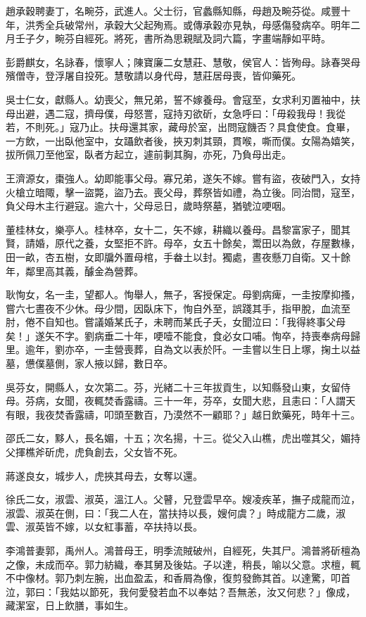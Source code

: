\begin{pinyinscope}
趙承穀聘妻丁，名畹芬，武進人。父士衍，官蠡縣知縣，母趙及畹芬從。咸豐十年，洪秀全兵破常州，承穀大父起殉焉。或傳承穀亦見執，母感傷發病卒。明年二月壬子夕，畹芬自經死。將死，書所為思親賦及詞六篇，字畫端靜如平時。

彭爵麒女，名詠春，懷寧人；陳寶廉二女慧莊、慧敬，侯官人：皆殉母。詠春哭母殯僧寺，登浮屠自投死。慧敬請以身代母，慧莊居母喪，皆仰藥死。

吳士仁女，獻縣人。幼喪父，無兄弟，誓不嫁養母。會寇至，女求利刃置袖中，扶母出避，遇二寇，擠母僕，母怒詈，寇持刃欲斫，女急呼曰：「毋殺我母！我從若，不則死。」寇乃止。扶母還其家，藏母於室，出問寇饑否？具食使食。食畢，一方飲，一出臥他室中，女躡飲者後，挾刃刺其頸，貫喉，嘶而僕。女陽為嬉笑，拔所佩刀至他室，臥者方起立，遽前剚其胸，亦死，乃負母出走。

王濟源女，棗強人。幼即能事父母。寡兄弟，遂矢不嫁。嘗有盜，夜破門入，女持火槍立暗陬，擊一盜斃，盜乃去。喪父母，葬祭皆如禮，為立後。同治間，寇至，負父母木主行避寇。逾六十，父母忌日，歲時祭墓，猶號泣哽咽。

董桂林女，樂亭人。桂林卒，女十二，矢不嫁，耕織以養母。昌黎富家子，聞其賢，請婚，原代之養，女堅拒不許。母卒，女五十餘矣，鬻田以為斂，存屋數椽，田一畝，杏五樹，女即牖外置母棺，手畚土以封。獨處，晝夜懸刀自衛。又十餘年，鄰里高其義，醵金為營葬。

耿恂女，名一圭，望都人。恂舉人，無子，客授保定。母劉病痺，一圭按摩抑搔，嘗六七晝夜不少休。母少間，因臥床下，恂自外至，誤踐其手，指甲脫，血流至肘，倦不自知也。嘗議婚某氏子，未聘而某氏子夭，女聞泣曰：「我得終事父母矣！」遂矢不字。劉病垂二十年，哽噎不能食，食必女口哺。恂卒，持喪奉病母歸里。逾年，劉亦卒，一圭營喪葬，自為文以表於阡。一圭嘗以生日上塚，掬土以益墓，憊僕墓側，家人掖以歸，數日卒。

吳芬女，開縣人，女次第二。芬，光緒二十三年拔貢生，以知縣發山東，女留侍母。芬病，女聞，夜輒焚香露禱。三十一年，芬卒，女聞大悲，且恚曰：「人謂天有眼，我夜焚香露禱，叩頭至數百，乃漠然不一顧耶？」越日飲藥死，時年十三。

邵氏二女，黟人，長名媚，十五；次名揚，十三。從父入山樵，虎出噬其父，媚持父揮樵斧斫虎，虎負創去，父女皆不死。

蔣遂良女，城步人，虎挾其母去，女奪以還。

徐氏二女，淑雲、淑英，溫江人。父瞽，兄登雲早卒。嫂凌疾革，撫子成龍而泣，淑雲、淑英在側，曰：「我二人在，當扶持以長，嫂何虞？」時成龍方二歲，淑雲、淑英皆不嫁，以女紅事蓄，卒扶持以長。

李鴻普妻郭，禹州人。鴻普母王，明季流賊破州，自經死，失其尸。鴻普將斫檀為之像，未成而卒。郭力紡織，奉其舅及後姑。子以達，稍長，喻以父意。求檀，輒不中像材。郭乃刺左腕，出血盈盂，和香屑為像，復剪發飾其首。以達驚，叩首泣，郭曰：「我姑以節死，我何愛發若血不以奉姑？吾無恙，汝又何悲？」像成，藏潔室，日上飲膳，事如生。


\end{pinyinscope}
